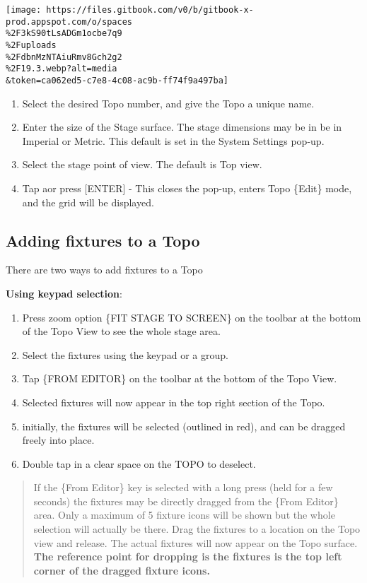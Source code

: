 \documentclass[
]{article}
\begin{document}
\texttt{[image: https://files.gitbook.com/v0/b/gitbook-x-prod.appspot.com/o/spaces\\\%2F3kS90tLsADGm1ocbe7q9\\\%2Fuploads\\\%2FdbnMzNTAiuRmv8Gch2g2\\\%2F19.3.webp?alt=media\\\&token=ca062ed5-c7e8-4c08-ac9b-ff74f9a497ba]}

\begin{enumerate}
\def\labelenumi{\arabic{enumi}.}
\setcounter{enumi}{1}
\item
  Select the desired Topo number, and give the Topo a unique name.
\item
  Enter the size of the Stage surface. The stage dimensions may be in be in Imperial or Metric. This default is set in the System Settings pop-up.
\item
  Select the stage point of view. The default is Top view.
\item
  Tap \href{image.png}{} aor press {[}ENTER{]} - This closes the pop-up, enters Topo \{Edit\} mode, and the grid will be displayed.
\end{enumerate}

\hypertarget{adding-fixtures-to-a-topo}{%
\subsection{Adding fixtures to a Topo}\label{adding-fixtures-to-a-topo}}

There are two ways to add fixtures to a Topo

\textbf{Using keypad selection}:

\begin{enumerate}
\def\labelenumi{\arabic{enumi}.}
\item
  Press zoom option \{FIT STAGE TO SCREEN\} on the toolbar at the bottom of the Topo View to see the whole stage area.
\item
  Select the fixtures using the keypad or a group.
\item
  Tap \{FROM EDITOR\} on the toolbar at the bottom of the Topo View.
\item
  Selected fixtures will now appear in the top right section of the Topo.
\item
  initially, the fixtures will be selected (outlined in red), and can be dragged freely into place.
\item
  Double tap in a clear space on the TOPO to deselect.
\end{enumerate}

\begin{quote}
{If the \{From Editor\} key is selected with a long press (held for a few seconds) the fixtures may be directly dragged from the \{From Editor\} area. Only a maximum of 5 fixture icons will be shown but the whole selection will actually be there. Drag the fixtures to a location on the Topo view and release. The actual fixtures will now appear on the Topo surface. \textbf{The reference point for dropping is the fixtures is the top left corner of the dragged fixture icons.}}
\end{quote}
\end{document}
